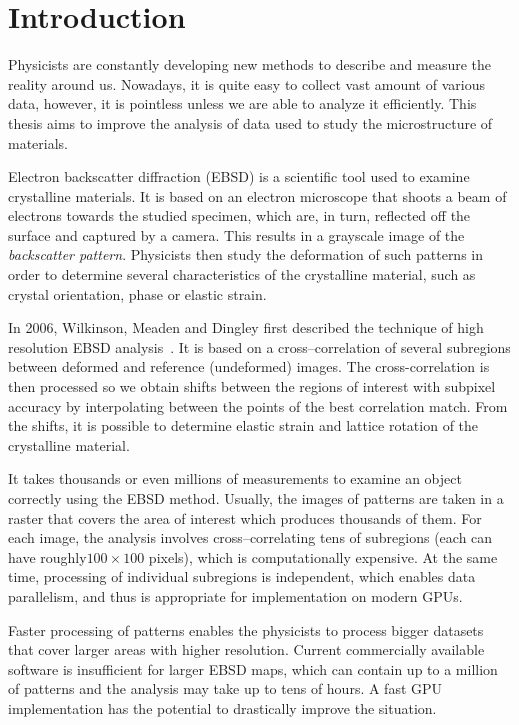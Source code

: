 \chapter*{Introduction}

Physicists are constantly developing new methods to describe and measure the reality around us.
Nowadays, it is quite easy to collect vast amount of various data, however, it is pointless unless we are able to analyze it efficiently.
This thesis aims to improve the analysis of data used to study the microstructure of materials.

Electron backscatter diffraction (EBSD) is a scientific tool used to examine crystalline materials. 
It is based on an electron microscope that shoots a beam of electrons towards the studied specimen, which are, in turn, reflected off the surface and captured by a camera.
This results in a grayscale image of the \emph{backscatter pattern}. 
Physicists then study the deformation of such patterns in order to determine several characteristics of the crystalline material, such as crystal orientation, phase or elastic strain.

In 2006, Wilkinson, Meaden and Dingley first described the technique of high resolution EBSD analysis~\cite{wilkinson2006high}.
It is based on a cross--correlation of several subregions between deformed and reference (undeformed) images.
The cross-correlation is then processed so we obtain shifts between the regions of interest with subpixel accuracy by interpolating between the points of the best correlation match.
From the shifts, it is possible to determine elastic strain and lattice rotation of the crystalline material.

It takes thousands or even millions of measurements to examine an object correctly using the EBSD method.
Usually, the images of patterns are taken in a raster that covers the area of interest which produces thousands of them. 
For each image, the analysis involves cross--correlating tens of subregions (each can have roughly$100\times100$ pixels), which is computationally expensive. 
At the same time, processing of individual subregions is independent, which enables data parallelism, and thus is appropriate for implementation on modern GPUs.

Faster processing of patterns enables the physicists to process bigger datasets that cover larger areas with higher resolution. 
Current commercially available software is insufficient for larger EBSD maps, which can contain up to a million of patterns and the analysis may take up to tens of hours.
A fast GPU implementation has the potential to drastically improve the situation.

